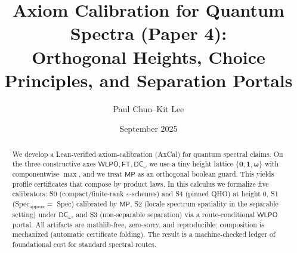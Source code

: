 \documentclass[11pt]{article}
\title{Axiom Calibration for Quantum Spectra (Paper 4):\\
Orthogonal Heights, Choice Principles, and Separation Portals}
\author{Paul Chun--Kit Lee}
\date{September 2025}
\newcommand{\WLPO}{\mathsf{WLPO}}
\newcommand{\FT}{\mathsf{FT}}
\newcommand{\DCw}{\mathsf{DC}_{\omega}}
\newcommand{\MP}{\mathsf{MP}}
\newcommand{\hzero}{\mathbf{0}}
\newcommand{\hone}{\mathbf{1}}
\newcommand{\homega}{\boldsymbol{\omega}}
\theoremstyle{plain}
\theoremstyle{definition}
\theoremstyle{remark}
\begin{document}
\maketitle

\begin{abstract}
We develop a Lean-verified axiom-calibration (AxCal) for quantum spectral claims.
On the three constructive axes \(\WLPO,\FT,\DCw\) we use a tiny height lattice
\(\{\hzero,\hone,\homega\}\) with componentwise \(\max\), and we treat \(\MP\) as an
orthogonal boolean guard. This yields profile certificates that compose by product
laws. In this calculus we formalize five calibrators:
S0 (compact/finite-rank \(\varepsilon\)-schemes) and S4 (pinned QHO) at height \(0\),
S1 (Spec\(_{\mathrm{approx}}=\) Spec) calibrated by \(\MP\), S2 (locale spectrum spatiality
in the separable setting) under \(\DCw\), and S3 (non-separable separation) via a
route-conditional \(\WLPO\) portal. All artifacts are mathlib-free, zero-sorry, and
reproducible; composition is mechanized (automatic certificate folding). The result
is a machine-checked ledger of foundational cost for standard spectral routes.
\end{abstract}

\tableofcontents

\noindent{}
\end{document}
